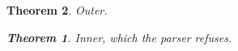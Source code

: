 \documentclass{article}
\newtheorem{thm}{Theorem}
\begin{document}
\begin{thm}\label{thm:outer}
Outer.
\begin{thm}\label{thm:inner}
Inner, which the parser refuses.
\end{thm}
\end{thm}
\end{document}
